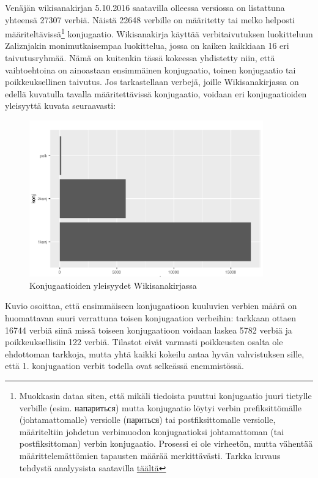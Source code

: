 \documentclass[]{scrreprt}
\begin{document}
Venäjän wikisanakirjan 5.10.2016 saatavilla olleessa versiossa on
listattuna\\
yhteensä 27307 verbiä. Näistä 22648 verbille on määritetty tai melko
helposti määriteltävissä\footnote{Muokkasin dataa siten, että mikäli
  tiedoista puuttui konjugaatio juuri tietylle verbille (esim.
  напариться) mutta konjugaatio löytyi verbin prefiksittömälle
  (johtamattomalle) versiolle (париться) tai postfiksittomalle
  versiolle, määriteltiin johdetun verbimuodon konjugaatioksi
  johtamattoman (tai postfiksittoman) verbin konjugaatio. Prosessi ei
  ole virheetön, mutta vähentää määrittelemättömien tapausten määrää
  merkittävästi. Tarkka kuvaus tehdystä analyysista saatavilla
  \href{https://github.com/hrmJ/morfologia/blob/master/wikianalysis.Rmd}{täältä}}
konjugaatio. Wikisanakirja käyttää verbitaivutuksen luokitteluun
Zaliznjakin monimutkaisempaa luokittelua, jossa on kaiken kaikkiaan 16
eri taivutusryhmää. Nämä on kuitenkin tässä kokeessa yhdistetty niin,
että vaihtoehtoina on ainoastaan ensimmäinen konjugaatio, toinen
konjugaatio tai poikkeuksellinen taivutus. Jos tarkastellaan verbejä,
joille Wikisanakirjassa on edellä kuvatulla tavalla määritettävissä
konjugaatio, voidaan eri konjugaatioiden yleisyyttä kuvata seuraavasti:

\FloatBarrier
\begin{figure}[htbp]
\centering
    \includegraphics[width=0.9\textwidth,keepaspectratio]{../figure/wikidata.pdf}
\caption{Konjugaatioiden yleisyydet Wikisanakirjassa}
\end{figure}
\FloatBarrier

Kuvio osoittaa, että ensimmäiseen konjugaatioon kuuluvien verbien määrä
on huomattavan suuri verrattuna toisen konjugaation verbeihin: tarkkaan
ottaen 16744 verbiä siinä missä toiseen konjugaatioon voidaan laskea
5782 verbiä ja poikkeuksellisiin 122 verbiä. Tilastot eivät varmasti
poikkeusten osalta ole ehdottoman tarkkoja, mutta yhtä kaikki kokeilu
antaa hyvän vahvistuksen sille, että 1. konjugaation verbit todella ovat
selkeässä enemmistössä.
\end{document}
